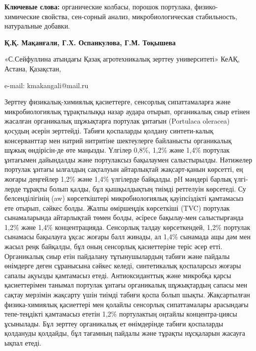 {\bfseries Ключевые слова:} органические колбасы, порошок портулака,
физико-химические свойства, сен-сорный анализ, микробиологическая
стабильность, натуральные добавки.

\begin{center}

{\bfseries Қ.Қ. Мақанғали\envelope, Г.Х. Оспанкулова, Г.М.
Тоқышева}

«С.Сейфуллина атындағы Қазақ агротехникалық зерттеу университеті» КеАҚ,
Астана, Қазақстан,

e-mail: kmakangali@mail.ru
\end{center}

Зерттеу физикалық-химиялық қасиеттерге, сенсорлық сипаттамаларға және
микробиологиялық тұрақтылыққа назар аудара отырып, органикалық сиыр
етінен жасалған органикалық шұжықтарға портулак ұнтағын (Portulaca
oleracea) қосудың әсерін зерттейді. Табиғи қоспаларды қолдану
синтети-калық консерванттар мен натрий нитритіне шектеулерге байланысты
органикалық шұжық өндірісін-де өте маңызды. Үлгілер 0,8\%, 1,2\% және
1,4\% портулак ұнтағымен дайындалды және портулаксыз бақылаумен
салыстырылды. Нәтижелер портулак ұнтағы ылғалдың сақталуын айтарлықтай
жақсарт-қанын көрсетті, ең жоғары деңгейлер 1,2\% және 1,4\% үлгілерде
байқалды. рH мәндері барлық үлгі-лерде тұрақты болып қалды, бұл
қышқылдықтың тиімді реттелуін көрсетеді. Су белсенділігінің (aw)
көрсеткіштері микробиологиялық қауіпсіздікті қамтамасыз ете отырып,
сәйкес болды. Жалпы өміршеңдік көрсеткіші (TVC) портулак сынамаларында
айтарлықтай төмен болды, әсіресе бақылау-мен салыстырғанда 1,2\% және
1,4\% концентрацияда. Сенсорлық талдау көрсеткендей, 1,2\% портулак
сынамасы бақылауға ұқсас жоғары балл жинады, ал 1,4\% сынамада ащы дәм
мен жасыл реңк байқалды, бұл оның сенсорлық қасиеттеріне теріс әсер
етті. Органикалық сиыр етін пайдалану тұтынушылардың табиғи және пайдалы
өнімдерге деген сұранысына сәйкес келеді, синтетикалық қоспаларсыз
жоғары сапалы ақуызды қамтамасыз етеді. Антиоксиданттық және микробқа
қарсы қасиеттерімен танымал портулак ұнтағы органикалық шұжықтардың
сапасы мен сақтау мерзімін жақсарту үшін тиімді табиғи қоспа болып
шықты. Жақсартылған физика-химиялық қасиеттері мен қолайлы сенсорлық
сипаттамалары арасындағы тепе-теңдікті қамтамасыз ететін 1,2\%
портулактың оңтайлы концентра-циясы ұсынылады. Бұл зерттеу органикалық ет
өнімдерінде табиғи қоспаларды қолдануды қолдайды, бұл тағамның пайдалы
және тұрақты нұсқаларын жасауға ықпал етеді.

